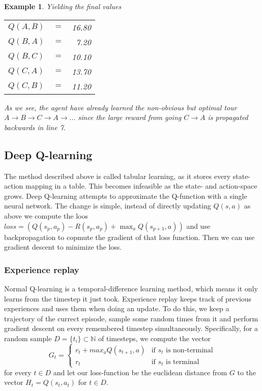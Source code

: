 \documentclass{article}
\theoremstyle{changedot}
\theoremstyle{changedotbreak}
\theoremstyle{nonumberplain}
\newtheorem{example}{Example}
\begin{document}
\begin{example}
  Yielding the final values

  \begin{tabular}{l c r}
    $Q(A, B)$ & $=$ & 16.80\\
    $Q(B, A)$ & $=$ & 7.20\\
    $Q(B, C)$ & $=$ & 10.10\\
    $Q(C, A)$ & $=$ & 13.70\\
    $Q(C, B)$ & $=$ & 11.20\\
  \end{tabular}

  As we see, the agent have already learned the non-obvious but optimal tour $A \rightarrow B \rightarrow C  \rightarrow A \rightarrow ...$ since the large reward from going $C \rightarrow A$ is propagated backwards in line 7. 

\end{example}


\subsection{Deep Q-learning}
The method described above is called tabular learning, as it stores every state-action mapping in a table. This becomes infeasible as the state- and action-space grows. Deep Q-learning attempts to approximate the Q-function with a single neural network. The change is simple, instead of directly updating $Q(s, a)$ as above we compute the loos $loss = (Q(s_{p}, a_{p}) - R(s_{p}, a_{p}) + \max_{a} Q(s_{p+1}, a))$ and use backpropagation to copmute the gradient of that loss function. Then we can use gradient descent to minimize the loss.


\subsubsection{Experience replay}
Normal Q-learning is a temporal-difference learning method, which means it only learns from the timestep it just took. Experience replay keeps track of previous experiences and uses them when doing an update. To do this, we keep a trajectory of the currect episode, sample some random times from it and perform gradient descent on every remembered timestep simultaneously. Specifically, for a random sample $D = \{t_{i}\} \subset \mathbb N$ of timesteps, we compute the vector
\[G_{t} =  \begin{cases}
    r_{t} + max_{a} Q(s_{t+1}, a) & \text{if $s_{t}$ is non-terminal} \\
    r_{t} & \text{if $s_{t}$ is terminal}
  \end{cases} \]
for every $t \in D$ and let our loss-function be the euclidean distance from $G$ to the vector $H_{t} = Q(s_{t}, a_{t})$ for $t \in D$.
\end{document}

